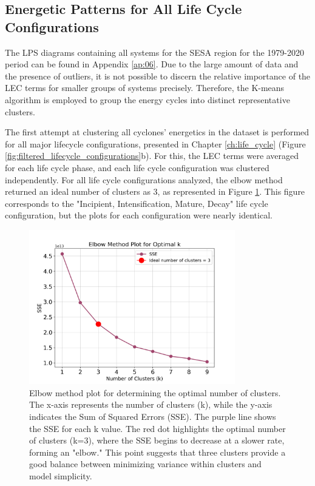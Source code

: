 \subsection{Energetic Patterns for All Life Cycle Configurations}\label{sec:energy_patterns}

The LPS diagrams containing all systems for the SESA region for the 1979-2020 period can be found in Appendix \ref{ap:06}. Due to the large amount of data and the presence of outliers, it is not possible to discern the relative importance of the LEC terms for smaller groups of systems precisely. Therefore, the K-means algorithm is employed to group the energy cycles into distinct representative clusters.

The first attempt at clustering all cyclones' energetics in the dataset is performed for all major lifecycle configurations, presented in Chapter \ref{ch:life_cycle} (Figure \ref{fig:filtered_lifecycle_configurations}b). For this, the LEC terms were averaged for each life cycle phase, and each life cycle configuration was clustered independently. For all life cycle configurations analyzed, the elbow method returned an ideal number of clusters as 3, as represented in Figure \ref{fig:elbow_method_plot}. This figure corresponds to the "Incipient, Intensification, Mature, Decay" life cycle configuration, but the plots for each configuration were nearly identical.

\begin{figure}[!htbp]
\centering
\includegraphics[width=0.8\textwidth]{figs_6/elbow_method_plot.png}
\caption[Elbow Method]{Elbow method plot for determining the optimal number of clusters. The x-axis represents the number of clusters (k), while the y-axis indicates the Sum of Squared Errors (SSE). The purple line shows the SSE for each k value. The red dot highlights the optimal number of clusters (k=3), where the SSE begins to decrease at a slower rate, forming an "elbow." This point suggests that three clusters provide a good balance between minimizing variance within clusters and model simplicity.}
\label{fig:elbow_method_plot}
\end{figure}

